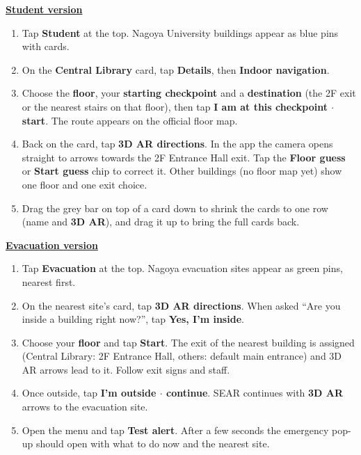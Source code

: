\documentclass[11pt,a4paper]{article}
\begin{document}
\medskip
\noindent\textbf{\underline{Student version}}
\begin{enumerate}[leftmargin=1.6em,itemsep=2pt,topsep=4pt]
  \item Tap \textbf{Student} at the top. Nagoya University buildings appear as blue pins
        with cards.
  \item On the \textbf{Central Library} card, tap \textbf{Details}, then
        \textbf{Indoor navigation}.
  \item Choose the \textbf{floor}, your \textbf{starting checkpoint} and a
        \textbf{destination} (the 2F exit or the nearest stairs on that floor), then tap
        \textbf{I am at this checkpoint $\cdot$ start}. The route appears on the official
        floor map.
  \item Back on the card, tap \textbf{3D AR directions}. In the app the camera opens
        straight to arrows towards the 2F Entrance Hall exit. Tap the \textbf{Floor guess} or
        \textbf{Start guess} chip to correct it. Other buildings (no floor map yet) show one
        floor and one exit choice.
  \item Drag the grey bar on top of a card down to shrink the cards to one row (name and
        \textbf{3D AR}), and drag it up to bring the full cards back.
\end{enumerate}

\medskip
\noindent\textbf{\underline{Evacuation version}}
\begin{enumerate}[leftmargin=1.6em,itemsep=2pt,topsep=4pt]
  \item Tap \textbf{Evacuation} at the top. Nagoya evacuation sites appear as green pins,
        nearest first.
  \item On the nearest site's card, tap \textbf{3D AR directions}. When asked
        ``Are you inside a building right now?'', tap \textbf{Yes, I'm inside}.
  \item Choose your \textbf{floor} and tap \textbf{Start}. The exit of the nearest building
        is assigned (Central Library: 2F Entrance Hall, others: default main entrance) and
        3D AR arrows lead to it. Follow exit signs and staff.
  \item Once outside, tap \textbf{I'm outside $\cdot$ continue}. SEAR continues with
        \textbf{3D AR} arrows to the evacuation site.
  \item Open the menu and tap \textbf{Test alert}. After a few seconds
        the emergency pop-up should open with what to do now and the nearest site.
\end{enumerate}
\end{document}
